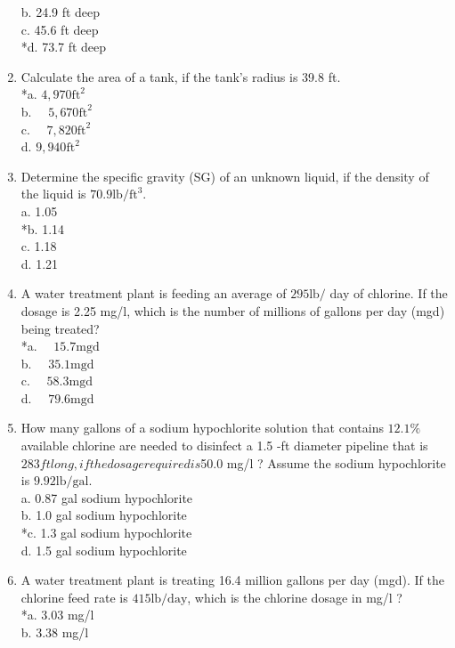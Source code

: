 \begin{enumerate}
b. 24.9 ft deep\\
c. 45.6 ft deep\\
*d. 73.7 ft deep\\
\item Calculate the area of a tank, if the tank's radius is 39.8 ft.\\
*a. $4,970 \mathrm{ft}^{2}$\\
b. $\quad 5,670 \mathrm{ft}^{2}$\\
c. $\quad 7,820 \mathrm{ft}^{2}$\\
d. $9,940 \mathrm{ft}^{2}$\\
\item Determine the specific gravity (SG) of an unknown liquid, if the density of the liquid is $70.9 \mathrm{lb} / \mathrm{ft}^{3}$.\\
a. 1.05 \\
*b. 1.14 \\
c. 1.18 \\
d. 1.21 \\
\item A water treatment plant is feeding an average of $295 \mathrm{lb} /$ day of chlorine. If the dosage is 2.25 mg/l, which is the number of millions of gallons per day (mgd) being treated?\\
*a. $\quad 15.7 \mathrm{mgd}$\\
b. $\quad 35.1 \mathrm{mgd}$\\
c. $\quad 58.3 \mathrm{mgd}$\\
d. $\quad 79.6 \mathrm{mgd}$\\
\item How many gallons of a sodium hypochlorite solution that contains $12.1 \%$ available chlorine are needed to disinfect a 1.5 -ft diameter pipeline that is $283 ft long, if the dosage required is $50.0 mg/l ? Assume the sodium hypochlorite is $9.92 \mathrm{lb} / \mathrm{gal}$.\\
a. 0.87 gal sodium hypochlorite\\
b. 1.0 gal sodium hypochlorite\\
*c. 1.3 gal sodium hypochlorite\\
d. 1.5 gal sodium hypochlorite \\
\item A water treatment plant is treating 16.4 million gallons per day (mgd). If the chlorine feed rate is $415 \mathrm{lb} / \mathrm{day}$, which is the chlorine dosage in mg/l ?\\
*a. 3.03 mg/l\\
b. 3.38 mg/l\\

\end{enumerate}
